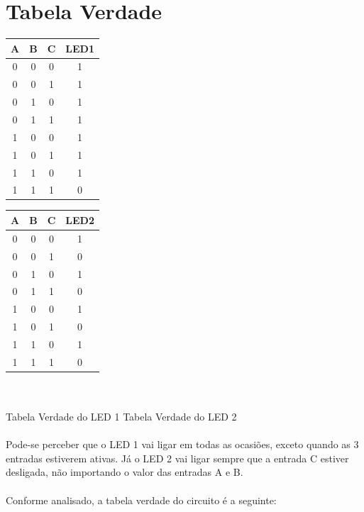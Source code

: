 \documentclass[]{article}
\begin{document}
\section{Tabela Verdade}
	\begin{tabular}{|c|c|c|c|}
		\hline
		\textbf{ A } & \textbf{ B } & \textbf{ C } & \textbf{LED1}\\
		\hline
		0 & 0 & 0 & 1 \\
		\hline
		0 & 0 & 1 & 1 \\
		\hline
		0 & 1 & 0 & 1 \\
		\hline
		0 & 1 & 1 & 1 \\
		\hline
		1 & 0 & 0 & 1 \\
		\hline
		1 & 0 & 1 & 1 \\
		\hline
		1 & 1 & 0 & 1 \\
		\hline
		1 & 1 & 1 & 0 \\
		\hline
	
	\end{tabular}
	\hfill
	\begin{tabular}{|c|c|c|c|}
		\hline
		\textbf{ A } & \textbf{ B } & \textbf{ C } & \textbf{LED2}\\
		\hline
		0 & 0 & 0 & 1 \\
		\hline
		0 & 0 & 1 & 0 \\
		\hline
		0 & 1 & 0 & 1 \\
		\hline
		0 & 1 & 1 & 0 \\
		\hline
		1 & 0 & 0 & 1 \\
		\hline
		1 & 0 & 1 & 0\\
		\hline
		1 & 1 & 0 & 1 \\
		\hline
		1 & 1 & 1 & 0 \\
		\hline
		
	\end{tabular}
	\\ \\
	Tabela Verdade do LED 1 
	\hfill
	Tabela Verdade do LED 2
	\\ 
	\\
	Pode-se perceber que o LED 1 vai ligar em todas as ocasiões, exceto quando as 3 entradas estiverem ativas. Já o LED 2 vai ligar sempre que a entrada C estiver desligada, não importando o valor das entradas A e B.
	\\
	\\
	Conforme analisado, a tabela verdade do circuito é a seguinte:
	\\
	\\
\end{document}
